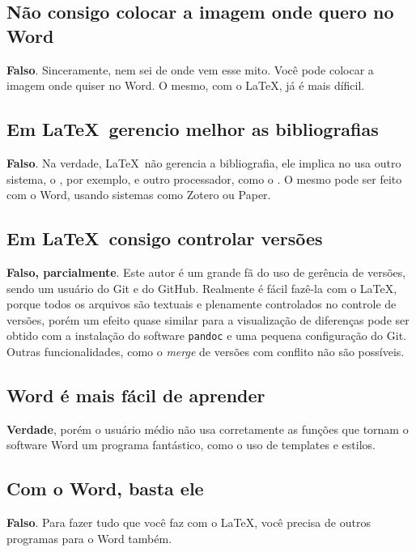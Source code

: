 \subsection{Não consigo colocar a imagem onde quero no Word}

\textbf{Falso}. Sinceramente, nem sei de onde vem esse mito. Você pode colocar a imagem onde quiser no Word. O mesmo, com o \LaTeX, já é mais díficil.

\subsection{Em \LaTeX\ gerencio melhor as bibliografias}

\textbf{Falso}.  Na verdade, \LaTeX\ não gerencia a bibliografia, ele implica no usa outro sistema, o , por exemplo, e outro processador, como o . O mesmo pode ser feito com o Word, usando sistemas como Zotero ou Paper.

\subsection{Em \LaTeX\  consigo controlar versões}

\textbf{Falso, parcialmente}. Este autor é um grande fã do uso de gerência de versões, sendo um usuário do Git e do GitHub. Realmente é fácil fazê-la com o \LaTeX , porque todos os arquivos são textuais e plenamente controlados no controle de versões, porém um efeito quase similar para a visualização de diferenças pode ser obtido com a instalação do software \texttt{pandoc} e uma pequena configuração do Git. Outras funcionalidades, como o \textit{merge} de versões com conflito não são possíveis.

\subsection{Word é mais fácil de aprender}

\textbf{Verdade}, porém o usuário médio não usa corretamente as funções que tornam o software Word um programa fantástico, como o uso de templates e estilos.

\subsection{Com o Word, basta ele}

\textbf{Falso}. Para fazer tudo que você faz com o \LaTeX , você precisa de outros programas para o Word também.

